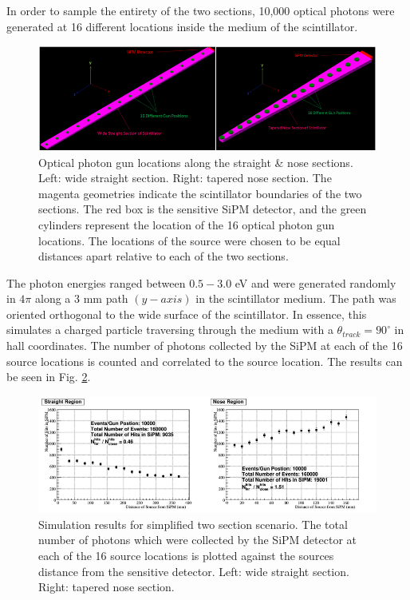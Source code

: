 In order to sample the entirety of the two sections, 10,000 optical photons were generated at 16 different locations inside the medium of the scintillator. 
	\begin{figure}[!htb]
	\centering
	\includegraphics[width=1.0\columnwidth]{simulation/figs/gun_locations}
	\caption{Optical photon gun locations along the straight \& nose sections. Left: wide straight section.  Right: tapered nose section.  The magenta geometries indicate the scintillator boundaries of the two sections.  The red box is the sensitive SiPM detector, and the green cylinders represent the location of the 16 optical photon gun locations. The locations of the source were chosen to be equal distances apart relative to each of the two sections.}
	\label{fig:gun_locations}
	\end{figure}
The photon energies ranged between $0.5 - 3.0$ eV \cite{krane_ch7} and were generated randomly in $4\pi$ along a 3 mm path $(y-axis)$ in the scintillator medium.  The path was oriented orthogonal to the wide surface of the scintillator.  In essence, this simulates a charged particle traversing through the medium with a $\theta_{track} = 90^{\circ}$ in hall coordinates.  The number of photons collected by the SiPM at each of the 16 source locations is counted and correlated to the source location.  The results can be seen in Fig. \ref{fig:sim_results}.
	\begin{figure}[!htb]
	\centering
	\includegraphics[width=1.0\columnwidth]{simulation/figs/sim_results_v2}
	\caption{Simulation results for simplified two section scenario. The total number of photons which were collected by the SiPM detector at each of the 16 source locations is plotted against the sources distance from the sensitive detector. Left: wide straight section.  Right: tapered nose section.}
	\label{fig:sim_results}
	\end{figure}
